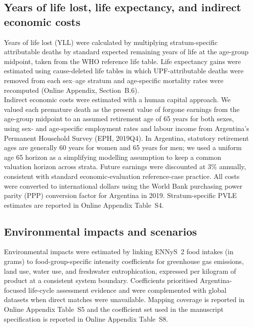 \documentclass{article}
\begin{document}
\subsection{Years of life lost, life expectancy, and indirect economic costs}

Years of life lost (YLL) were calculated by multiplying stratum-specific attributable deaths by standard expected remaining years of life at the age-group midpoint, taken from the WHO reference life table.\cite{WHO2024MethodsGBD} Life expectancy gains were estimated using cause-deleted life tables in which UPF-attributable deaths were removed from each sex--age stratum and age-specific mortality rates were recomputed (Online Appendix, Section~B.6). \\

Indirect economic costs were estimated with a human capital approach. We valued each premature death as the present value of forgone earnings from the age-group midpoint to an assumed retirement age of 65 years for both sexes, using sex- and age-specific employment rates and labour income from Argentina's Permanent Household Survey (EPH, 2019Q4).\cite{INDECEPH2019Q4,INDECMercadoTrabajo2020} In Argentina, statutory retirement ages are generally 60 years for women and 65 years for men; we used a uniform age 65 horizon as a simplifying modelling assumption to keep a common valuation horizon across strata.\cite{ANSESJubilacionOrdinaria2026} Future earnings were discounted at 3\% annually, consistent with standard economic-evaluation reference-case practice.\cite{iDSIReferenceCase2014,Sanders2016SecondPanel} All costs were converted to international dollars using the World Bank purchasing power parity (PPP) conversion factor for Argentina in 2019.\cite{WorldBankPPP2019} Stratum-specific PVLE estimates are reported in Online Appendix Table~S4.

\subsection{Environmental impacts and scenarios}

Environmental impacts were estimated by linking ENNyS~2 food intakes (in grams) to food-group-specific intensity coefficients for greenhouse gas emissions, land use, water use, and freshwater eutrophication, expressed per kilogram of product at a consistent system boundary. Coefficients prioritised Argentina-focused life-cycle assessment evidence\cite{Arrieta2018,Arrieta2021,Arrieta2022SustainSci} and were complemented with global datasets when direct matches were unavailable.\cite{PooreNemecek2018,OWIDDatasets2026,ADEMEAgribalyse2026} Mapping coverage is reported in Online Appendix Table~S5 and the coefficient set used in the manuscript specification is reported in Online Appendix Table~S8.
\end{document}
